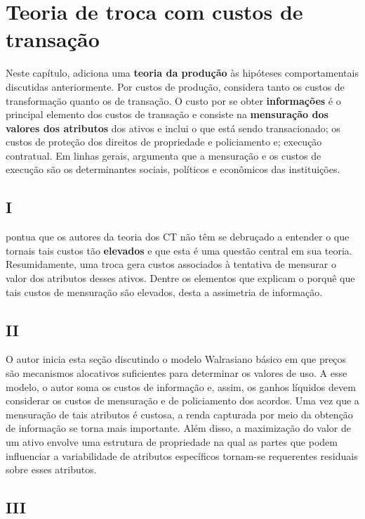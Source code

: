 \section{Teoria de troca com custos de transação}

Neste capítulo, \autor adiciona uma \textbf{teoria da produção} às hipóteses comportamentais discutidas anteriormente. Por custos de produção, considera tanto os custos de transformação quanto os de transação. O custo por se obter \textbf{informações} é o principal elemento dos custos de transação e consiste na \textbf{mensuração dos valores dos atributos} dos ativos e inclui o que está sendo transacionado; os custos de proteção dos direitos de propriedade e policiamento e; execução contratual. Em linhas gerais, argumenta que a mensuração e os custos de execução são os determinantes sociais, políticos e econômicos das instituições.

\subsection{I}

\autor pontua que os autores da teoria dos CT não têm se debruçado a entender o que tornais tais custos tão \textbf{elevados} e que esta é uma questão central em sua teoria. Resumidamente, uma troca gera custos associados à tentativa de mensurar o valor dos atributos desses ativos. Dentre os elementos que explicam o porquê que tais custos de mensuração são elevados, desta a assimetria de informação.

\subsection{II}

O autor inicia esta seção discutindo o modelo Walrasiano básico em que preços são mecanismos alocativos suficientes para determinar os valores de uso. A esse modelo, o autor soma os custos de informação e, assim, os ganhos líquidos devem considerar os custos de mensuração e de policiamento dos acordos. Uma vez que a mensuração de tais atributos é custosa, a renda capturada por meio da obtenção de informação se torna mais importante. Além disso, a maximização do valor de um ativo envolve uma estrutura de propriedade na qual as partes que podem influenciar a variabilidade de atributos específicos tornam-se requerentes residuais sobre esses atributos.

\subsection{III}

